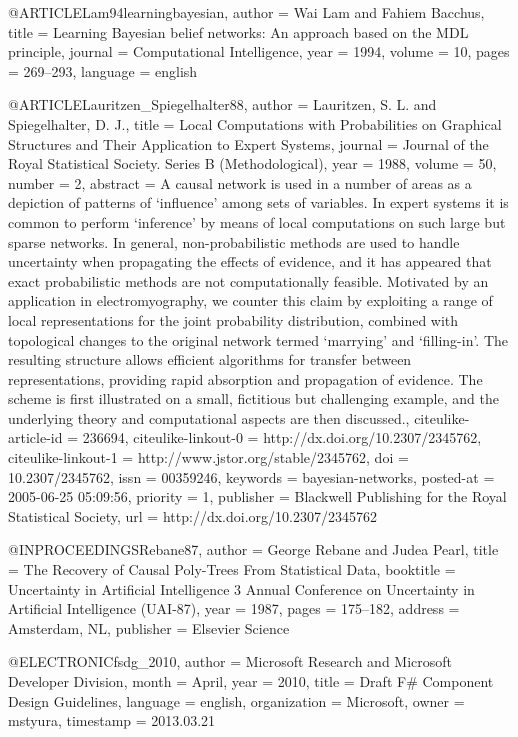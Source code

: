 @ARTICLE{Lam94learningbayesian,
  author = {Wai Lam and Fahiem Bacchus},
  title = {Learning Bayesian belief networks: An approach based on the MDL principle},
  journal = {Computational Intelligence},
  year = {1994},
  volume = {10},
  pages = {269--293},
  language = {english}
}

@ARTICLE{Lauritzen_Spiegelhalter88,
  author = {Lauritzen, S. L. and Spiegelhalter, D. J.},
  title = {{Local Computations with Probabilities on Graphical Structures and
	Their Application to Expert Systems}},
  journal = {Journal of the Royal Statistical Society. Series B (Methodological)},
  year = {1988},
  volume = {50},
  number = {2},
  abstract = {{A causal network is used in a number of areas as a depiction of patterns
	of `influence' among sets of variables. In expert systems it is common
	to perform `inference' by means of local computations on such large
	but sparse networks. In general, non-probabilistic methods are used
	to handle uncertainty when propagating the effects of evidence, and
	it has appeared that exact probabilistic methods are not computationally
	feasible. Motivated by an application in electromyography, we counter
	this claim by exploiting a range of local representations for the
	joint probability distribution, combined with topological changes
	to the original network termed `marrying' and `filling-in'. The resulting
	structure allows efficient algorithms for transfer between representations,
	providing rapid absorption and propagation of evidence. The scheme
	is first illustrated on a small, fictitious but challenging example,
	and the underlying theory and computational aspects are then discussed.}},
  citeulike-article-id = {236694},
  citeulike-linkout-0 = {http://dx.doi.org/10.2307/2345762},
  citeulike-linkout-1 = {http://www.jstor.org/stable/2345762},
  doi = {10.2307/2345762},
  issn = {00359246},
  keywords = {bayesian-networks},
  posted-at = {2005-06-25 05:09:56},
  priority = {1},
  publisher = {Blackwell Publishing for the Royal Statistical Society},
  url = {http://dx.doi.org/10.2307/2345762}
}

@INPROCEEDINGS{Rebane87,
  author = {George Rebane and Judea Pearl},
  title = {The Recovery of Causal Poly-Trees From Statistical Data},
  booktitle = {Uncertainty in Artificial Intelligence 3 Annual Conference on Uncertainty
	in Artificial Intelligence (UAI-87)},
  year = {1987},
  pages = {175--182},
  address = {Amsterdam, NL},
  publisher = {Elsevier Science}
}

@ELECTRONIC{fsdg_2010,
  author = {Microsoft Research and Microsoft Developer Division},
  month = {April},
  year = {2010},
  title = {Draft F\# Component Design Guidelines},
  language = {english},
  organization = {Microsoft},
  owner = {mstyura},
  timestamp = {2013.03.21}
}

